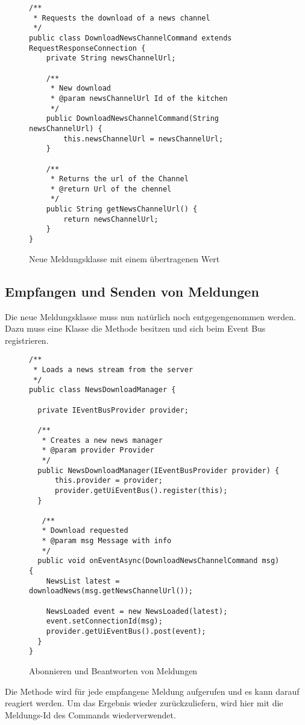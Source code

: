 \begin{figure}[H]
\begin{lstlisting}
/**
 * Requests the download of a news channel
 */
public class DownloadNewsChannelCommand extends RequestResponseConnection {
    private String newsChannelUrl;

    /**
     * New download
     * @param newsChannelUrl Id of the kitchen
     */
    public DownloadNewsChannelCommand(String newsChannelUrl) {
        this.newsChannelUrl = newsChannelUrl;
    }

    /**
     * Returns the url of the Channel
     * @return Url of the chennel
     */
    public String getNewsChannelUrl() {
        return newsChannelUrl;
    }
}
\end{lstlisting}
\caption{Neue Meldungsklasse mit einem übertragenen Wert}
\end{figure}

\subsection{Empfangen und Senden von Meldungen}
Die neue Meldungsklasse muss nun natürlich noch entgegengenommen werden. Dazu muss eine Klasse die Methode  besitzen und sich beim Event Bus registrieren.

\begin{figure}[H]
\begin{lstlisting}
/**
 * Loads a news stream from the server
 */
public class NewsDownloadManager {

  private IEventBusProvider provider;

  /**
   * Creates a new news manager
   * @param provider Provider
   */
  public NewsDownloadManager(IEventBusProvider provider) {
      this.provider = provider;
      provider.getUiEventBus().register(this);
  }
  
   /**
   * Download requested
   * @param msg Message with info
   */
  public void onEventAsync(DownloadNewsChannelCommand msg) {
  	NewsList latest = downloadNews(msg.getNewsChannelUrl());
  	
  	NewsLoaded event = new NewsLoaded(latest);
  	event.setConnectionId(msg);
  	provider.getUiEventBus().post(event);
  }
}
\end{lstlisting}
\caption{Abonnieren und Beantworten von Meldungen}
\end{figure}


Die Methode wird für jede empfangene Meldung aufgerufen und es kann darauf reagiert werden. Um das Ergebnis wieder zurückzuliefern, wird hier mit  die Meldungs-Id des Commands wiederverwendet.

